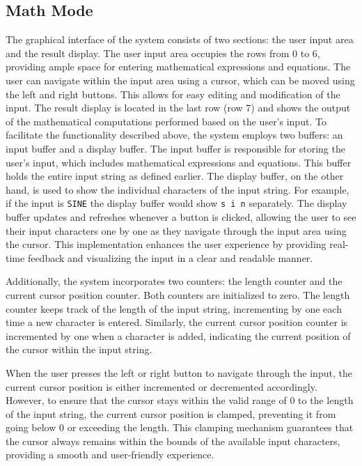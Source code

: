 \documentclass[a4paper, twoside]{report}
\begin{document}
\subsection{Math Mode}
The graphical interface of the system consists of two sections: the user input area and the result display. The user input area occupies the rows from 0 to 6, providing ample space for entering mathematical expressions and equations. The user can navigate within the input area using a cursor, which can be moved using the left and right buttons. This allows for easy editing and modification of the input. The result display is located in the last row (row 7) and shows the output of the mathematical computations performed based on the user's input. 
To facilitate the functionality described above, the system employs two buffers: an input buffer and a display buffer. The input buffer is responsible for storing the user's input, which includes mathematical expressions and equations. This buffer holds the entire input string as defined earlier. The display buffer, on the other hand, is used to show the individual characters of the input string. For example, if the input is \texttt{SINE} the display buffer would show \texttt{s i n} separately. The display buffer updates and refreshes whenever a button is clicked, allowing the user to see their input characters one by one as they navigate through the input area using the cursor. This implementation enhances the user experience by providing real-time feedback and visualizing the input in a clear and readable manner.

Additionally, the system incorporates two counters: the length counter and the current cursor position counter. Both counters are initialized to zero. The length counter keeps track of the length of the input string, incrementing by one each time a new character is entered. Similarly, the current cursor position counter is incremented by one when a character is added, indicating the current position of the cursor within the input string. 

When the user presses the left or right button to navigate through the input, the current cursor position is either incremented or decremented accordingly. However, to ensure that the cursor stays within the valid range of 0 to the length of the input string, the current cursor position is clamped, preventing it from going below 0 or exceeding the length. This clamping mechanism guarantees that the cursor always remains within the bounds of the available input characters, providing a smooth and user-friendly experience.
\end{document}
